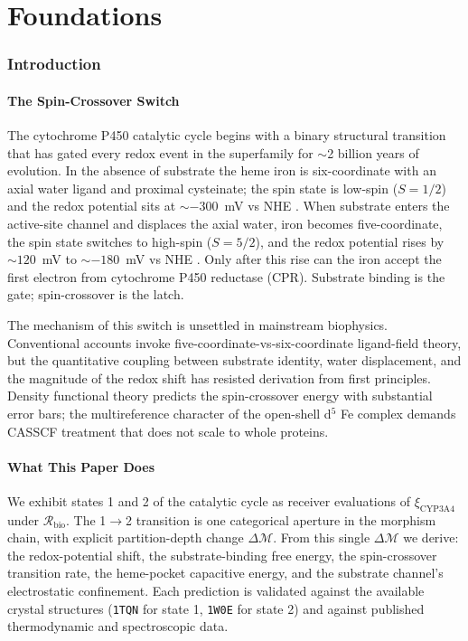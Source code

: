 \documentclass[11pt,twocolumn,a4paper]{article}
\theoremstyle{definition}
\theoremstyle{remark}
\newcommand{\Recv}{\mathcal{R}}
\newcommand{\Sexp}{\xi}
\newcommand{\depth}{\mathcal{M}}
\begin{document}
\part{Foundations}

\section{Introduction}
\label{sec:introduction}

\subsection{The Spin-Crossover Switch}

The cytochrome P450 catalytic cycle begins with a binary structural transition that has gated every redox event in the superfamily for $\sim$2 billion years of evolution. In the absence of substrate the heme iron is six-coordinate  with an axial water ligand and proximal cysteinate; the spin state is low-spin ($S = 1/2$) and the redox potential sits at $\sim -300$~mV vs NHE \citep{guengerich2018, denisov2005}. When substrate enters the active-site channel and displaces the axial water, iron becomes five-coordinate, the spin state switches to high-spin ($S = 5/2$), and the redox potential rises by $\sim 120$~mV to $\sim -180$~mV vs NHE \citep{daff1997}. Only after this rise can the iron accept the first electron from cytochrome P450 reductase (CPR). Substrate binding is the gate; spin-crossover is the latch.

The mechanism of this switch is unsettled in mainstream biophysics. Conventional accounts invoke five-coordinate-vs-six-coordinate ligand-field theory, but the quantitative coupling between substrate identity, water displacement, and the magnitude of the redox shift has resisted derivation from first principles. Density functional theory predicts the spin-crossover energy with substantial error bars; the multireference character of the open-shell d$^5$ Fe complex demands CASSCF treatment that does not scale to whole proteins.

\subsection{What This Paper Does}

We exhibit states 1 and 2 of the catalytic cycle as receiver evaluations of $\Sexp_{\mathrm{CYP3A4}}$ under $\Recv_{\mathrm{bio}}$. The 1$\to$2 transition is one categorical aperture in the morphism chain, with explicit partition-depth change $\Delta\depth$. From this single $\Delta\depth$ we derive: the redox-potential shift, the substrate-binding free energy, the spin-crossover transition rate, the heme-pocket capacitive energy, and the substrate channel's electrostatic confinement. Each prediction is validated against the available crystal structures (\texttt{1TQN} for state 1, \texttt{1W0E} for state 2) and against published thermodynamic and spectroscopic data.
\end{document}

